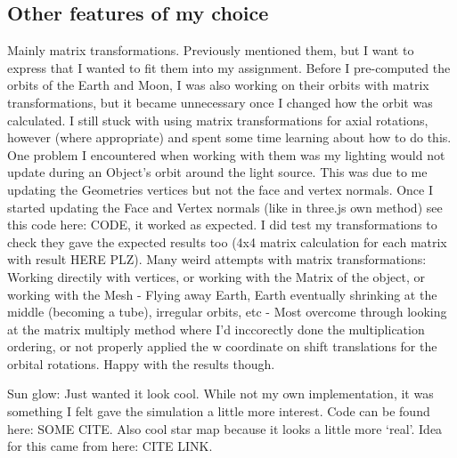 \documentclass[12pt]{article}
\begin{document}
\subsection{Other features of my choice}
Mainly matrix transformations. Previously mentioned them, but I want to express that I wanted to fit them into my assignment. Before I pre-computed the orbits of the Earth and Moon, I was also working on their orbits with matrix transformations, but it became unnecessary once I changed how the orbit was calculated. I still stuck with using matrix transformations for axial rotations, however (where appropriate) and spent some time learning about how to do this. One problem I encountered when working with them was my lighting would not update during an Object's orbit around the light source. This was due to me updating the Geometries vertices but not the face and vertex normals. Once I started updating the Face and Vertex normals (like in three.js own method) see this code here: CODE, it worked as expected. I did test my transformations to check they gave the expected results too (4x4 matrix calculation for each matrix with result HERE PLZ). Many weird attempts with matrix transformations: Working directily with vertices, or working with the Matrix of the object, or working with the Mesh - Flying away Earth, Earth eventually shrinking at the middle (becoming a tube), irregular orbits, etc - Most overcome through looking at the matrix multiply method where I'd inccorectly done the multiplication ordering, or not properly applied the w coordinate on shift translations for the orbital rotations. Happy with the results though.

Sun glow: Just wanted it look cool. While not my own implementation, it was something I felt gave the simulation a little more interest. Code can be found here: SOME CITE. Also cool star map because it looks a little more `real'. Idea for this came from here: CITE LINK.


\end{document}
